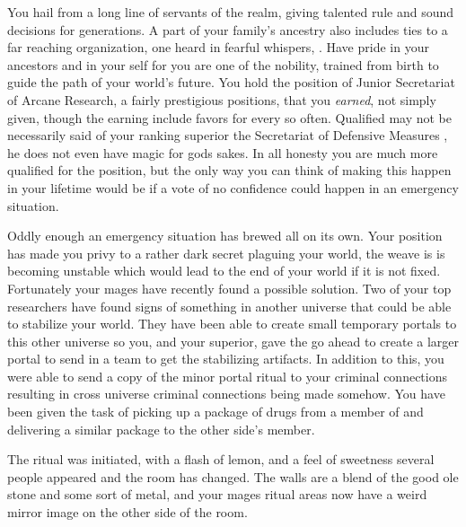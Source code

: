 \documentclass[char]{guildcamp3}
\begin{document}
\name{\cNobleTwo{}}

You hail from a long line of servants of the realm, giving talented rule and sound decisions for generations. A part of your family's ancestry also includes ties to a far reaching organization, one heard in fearful whispers, \bMagicMob{}. Have pride in your ancestors and in your self for you are one of the nobility, trained from birth to guide the path of your world's future. You hold the position of Junior Secretariat of Arcane Research, a fairly prestigious positions, that you \emph{earned}, not simply given, though the earning include favors for \bMagicMob{} every so often. Qualified may not be necessarily said of your ranking superior the Secretariat of Defensive Measures \cNobleOne{}, he does not even have magic for gods sakes. In all honesty you are much more qualified for the position, but the only way you can think of making this happen in your lifetime would be if a vote of no confidence could happen in an emergency situation. 

Oddly enough an emergency situation has brewed all on its own. Your position has made you privy to a rather dark secret plaguing your world, the weave is is becoming unstable which would lead to the end of your world if it is not fixed. Fortunately your mages have recently found a possible solution. Two of your top researchers have found signs of something in another universe that could be able to stabilize your world. They have been able to create small temporary portals to this other universe so you, and your superior, gave the go ahead to create a larger portal to send in a team to get the stabilizing artifacts. In addition to this, you were able to send a copy of the minor portal ritual to your criminal connections resulting in cross universe criminal connections being made somehow. You have been given the task of picking up a package of drugs from a member of \bTechMob{} and delivering a similar package to the other side's member. 



The ritual was initiated, with a flash of lemon, and a feel of sweetness several people appeared and the room has changed. The walls are a blend of the good ole stone and some sort of metal, and your mages ritual areas now have a weird mirror image on the other side of the room. 
\end{document}
